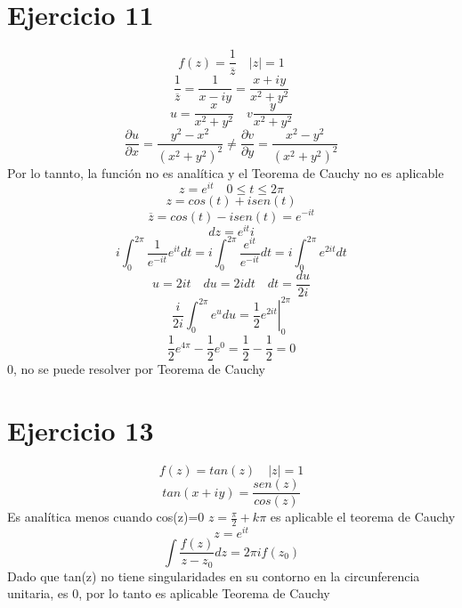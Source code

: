 \documentclass{article}
\begin{document}
\section{Ejercicio 11}
\[
f(z)= \frac{1}{\overline{z}} \quad |z|=1
\]
\begin{equation}
\frac{1}{\overline{z}}=\frac{1}{x-iy}=\frac{x+iy}{x^2+y^2}
\end{equation}
\begin{equation}
u=\frac{x}{x^2+y^2} \quad v\frac{y}{x^2+y^2}
\end{equation}
\begin{equation}
\frac{\partial u}{\partial x}= \frac{y^2-x^2}{(x^2+y^2)^2} \neq \frac{\partial v}{\partial y}= \frac{x^2-y^2}{(x^2+y^2)^2}
\end{equation}
Por lo tannto, la función no es analítica y el Teorema de Cauchy no es aplicable
\begin{equation}
z=e^{it} \quad 0\leq t\leq 2\pi
\end{equation}
\begin{equation}
z=cos(t)+isen(t)
\end{equation}
\begin{equation}
\overline{z}=cos(t)-isen(t)=e^{-it}
\end{equation}
\begin{equation}
dz=e^{it}i
\end{equation}
\begin{equation}
i \int_{0}^{2\pi}\frac{1}{e^{-it}}e^{it}dt = i \int_{0}^{2\pi}\frac{e^{it}}{e^{-it}}dt=i \int_{0}^{2\pi} e^{2it}dt
\end{equation}
\begin{equation}
u=2it \quad du=2idt\quad dt=\frac{du}{2i}
\end{equation}
\begin{equation}
\frac{i}{2i}\int_{0}^{2\pi} e^udu= \left.\frac{1}{2} e^{2it}\right|_0^{2\pi}
\end{equation}
\begin{equation}
\frac{1}{2}e^{4\pi}-\frac{1}{2}e^0=\frac{1}{2}-\frac{1}{2}=0
\end{equation}
0, no se puede resolver por Teorema de Cauchy



\section{Ejercicio 13}
\[
f(z)= tan(z) \quad |z|=1
\]
\begin{equation}
tan(x+iy)=\frac{sen(z)}{cos(z)}
\end{equation}
Es analítica menos cuando cos(z)=0
\( z=\frac{\pi}{2}+k\pi\) es aplicable el teorema de Cauchy 
\begin{equation}
z=e^{it}
\end{equation}
\begin{equation}
\int \frac{f(z)}{z-z_0}dz=2\pi i f(z_0)
\end{equation}
Dado que tan(z) no tiene singularidades en su contorno en la circunferencia unitaria, es 0, por lo tanto es aplicable Teorema de Cauchy
\end{document}
